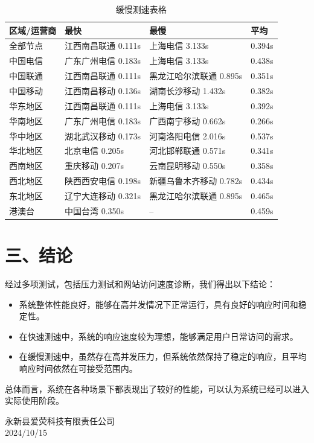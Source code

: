 \documentclass{article}
\begin{document}
\begin{table}[H]
    \centering
    \begin{tabular}{|l|l|l|l|}
        \hline
        \textbf{区域/运营商} & \textbf{最快} & \textbf{最慢} & \textbf{平均} \\ \hline
        全部节点 & 江西南昌联通 0.111s & 上海电信 3.133s & 0.394s \\ \hline
        中国电信 & 广东广州电信 0.183s & 上海电信 3.133s & 0.438s \\ \hline
        中国联通 & 江西南昌联通 0.111s & 黑龙江哈尔滨联通 0.895s & 0.351s \\ \hline
        中国移动 & 江西南昌移动 0.136s & 湖南长沙移动 1.432s & 0.382s \\ \hline
        华东地区 & 江西南昌联通 0.111s & 上海电信 3.133s & 0.392s \\ \hline
        华南地区 & 广东广州电信 0.183s & 广西南宁移动 0.662s & 0.266s \\ \hline
        华中地区 & 湖北武汉移动 0.173s & 河南洛阳电信 2.016s & 0.537s \\ \hline
        华北地区 & 北京电信 0.205s & 河北邯郸联通 0.571s & 0.341s \\ \hline
        西南地区 & 重庆移动 0.207s & 云南昆明移动 0.550s & 0.358s \\ \hline
        西北地区 & 陕西西安电信 0.198s & 新疆乌鲁木齐移动 0.782s & 0.434s \\ \hline
        东北地区 & 辽宁大连移动 0.321s & 黑龙江哈尔滨联通 0.895s & 0.465s \\ \hline
        港澳台 & 中国台湾 0.350s & -- & 0.459s \\ \hline
    \end{tabular}
    \caption{缓慢测速表格}
\end{table}

\section*{三、结论}
经过多项测试，包括压力测试和网站访问速度诊断，我们得出以下结论：
\begin{itemize}
    \item 系统整体性能良好，能够在高并发情况下正常运行，具有良好的响应时间和稳定性。
    \item 在快速测速中，系统的响应速度较为理想，能够满足用户日常访问的需求。
    \item 在缓慢测速中，虽然存在高并发压力，但系统依然保持了稳定的响应，且平均响应时间依然在可接受范围内。
\end{itemize}

总体而言，系统在各种场景下都表现出了较好的性能，可以认为系统已经可以进入实际使用阶段。\\
\vspace{2cm} %


\hfill
\parbox{5em}{
\centering
永新县爱荧科技有限责任公司 \\
2024/10/15
}
\hfill

\vspace{2cm} %
\end{document}

